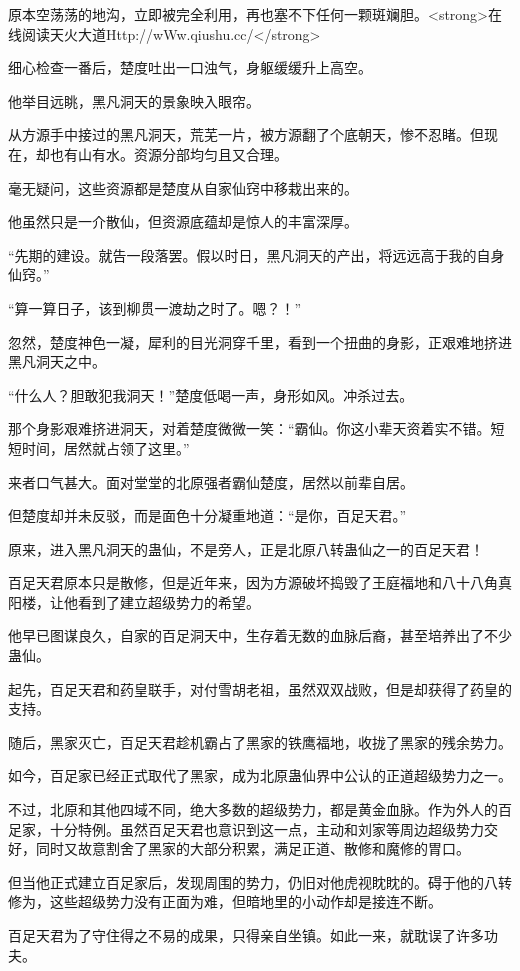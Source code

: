 \begin{this_body}
原本空荡荡的地沟，立即被完全利用，再也塞不下任何一颗斑斓胆。<strong>在线阅读天火大道Http://wWw.qiushu.cc/</strong>

细心检查一番后，楚度吐出一口浊气，身躯缓缓升上高空。

他举目远眺，黑凡洞天的景象映入眼帘。

从方源手中接过的黑凡洞天，荒芜一片，被方源翻了个底朝天，惨不忍睹。但现在，却也有山有水。资源分部均匀且又合理。

毫无疑问，这些资源都是楚度从自家仙窍中移栽出来的。

他虽然只是一介散仙，但资源底蕴却是惊人的丰富深厚。

“先期的建设。就告一段落罢。假以时日，黑凡洞天的产出，将远远高于我的自身仙窍。”

“算一算日子，该到柳贯一渡劫之时了。嗯？！”

忽然，楚度神色一凝，犀利的目光洞穿千里，看到一个扭曲的身影，正艰难地挤进黑凡洞天之中。

“什么人？胆敢犯我洞天！”楚度低喝一声，身形如风。冲杀过去。

那个身影艰难挤进洞天，对着楚度微微一笑：“霸仙。你这小辈天资着实不错。短短时间，居然就占领了这里。”

来者口气甚大。面对堂堂的北原强者霸仙楚度，居然以前辈自居。

但楚度却并未反驳，而是面色十分凝重地道：“是你，百足天君。”

原来，进入黑凡洞天的蛊仙，不是旁人，正是北原八转蛊仙之一的百足天君！

百足天君原本只是散修，但是近年来，因为方源破坏捣毁了王庭福地和八十八角真阳楼，让他看到了建立超级势力的希望。

他早已图谋良久，自家的百足洞天中，生存着无数的血脉后裔，甚至培养出了不少蛊仙。

起先，百足天君和药皇联手，对付雪胡老祖，虽然双双战败，但是却获得了药皇的支持。

随后，黑家灭亡，百足天君趁机霸占了黑家的铁鹰福地，收拢了黑家的残余势力。

如今，百足家已经正式取代了黑家，成为北原蛊仙界中公认的正道超级势力之一。

不过，北原和其他四域不同，绝大多数的超级势力，都是黄金血脉。作为外人的百足家，十分特例。虽然百足天君也意识到这一点，主动和刘家等周边超级势力交好，同时又故意割舍了黑家的大部分积累，满足正道、散修和魔修的胃口。

但当他正式建立百足家后，发现周围的势力，仍旧对他虎视眈眈的。碍于他的八转修为，这些超级势力没有正面为难，但暗地里的小动作却是接连不断。

百足天君为了守住得之不易的成果，只得亲自坐镇。如此一来，就耽误了许多功夫。


\end{this_body}
